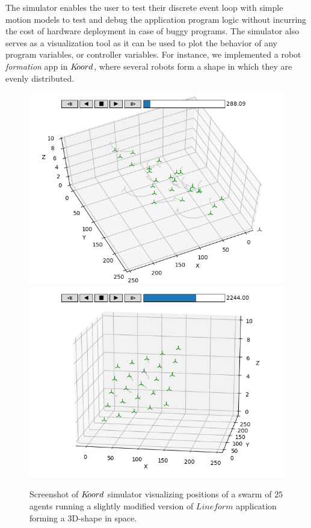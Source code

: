 The simulator enables the user to test their discrete event loop with simple motion models to test and debug the application program logic without incurring the cost of hardware deployment in case of buggy programs. The simulator also serves as a visualization tool as it can be used to plot the behavior of any program variables, or controller variables. For instance, we implemented a robot \emph{formation} app in $K\kern-2pt oord$, where several robots form a shape in which they are evenly distributed.

\begin{figure}[h!]
\begin{minipage}{0.5\textwidth}
\includegraphics[width=.5\textwidth]{figs/formation1.png}\hfill
\includegraphics[width=.5\textwidth]{figs/formation4.png}\hfill%
\end{minipage}%
\caption{Screenshot of $K\kern-2pt oord$ simulator visualizing positions of a swarm of $25$ agents running a slightly modified version of $\mathit{Lineform}$ application forming a 3D-shape in space.}
\label{fig:shapeplots}
\end{figure}











